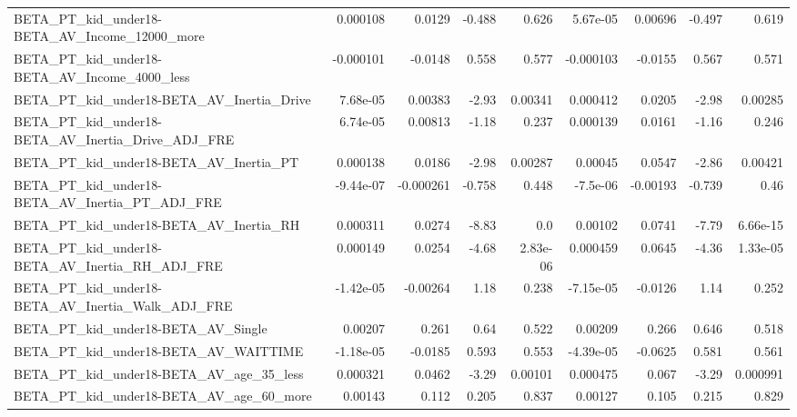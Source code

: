 \begin{tabular}{lrrrrrrrr}
BETA\_PT\_kid\_under18-BETA\_AV\_Income\_12000\_more      &    0.000108 &       0.0129 &   -0.488 &    0.626 &   5.67e-05 &     0.00696 &       -0.497 &         0.619 \\
BETA\_PT\_kid\_under18-BETA\_AV\_Income\_4000\_less       &   -0.000101 &      -0.0148 &    0.558 &    0.577 &  -0.000103 &     -0.0155 &        0.567 &         0.571 \\
BETA\_PT\_kid\_under18-BETA\_AV\_Inertia\_Drive          &    7.68e-05 &      0.00383 &    -2.93 &  0.00341 &   0.000412 &      0.0205 &        -2.98 &       0.00285 \\
BETA\_PT\_kid\_under18-BETA\_AV\_Inertia\_Drive\_ADJ\_FRE  &    6.74e-05 &      0.00813 &    -1.18 &    0.237 &   0.000139 &      0.0161 &        -1.16 &         0.246 \\
BETA\_PT\_kid\_under18-BETA\_AV\_Inertia\_PT             &    0.000138 &       0.0186 &    -2.98 &  0.00287 &    0.00045 &      0.0547 &        -2.86 &       0.00421 \\
BETA\_PT\_kid\_under18-BETA\_AV\_Inertia\_PT\_ADJ\_FRE     &   -9.44e-07 &    -0.000261 &   -0.758 &    0.448 &   -7.5e-06 &    -0.00193 &       -0.739 &          0.46 \\
BETA\_PT\_kid\_under18-BETA\_AV\_Inertia\_RH             &    0.000311 &       0.0274 &    -8.83 &      0.0 &    0.00102 &      0.0741 &        -7.79 &      6.66e-15 \\
BETA\_PT\_kid\_under18-BETA\_AV\_Inertia\_RH\_ADJ\_FRE     &    0.000149 &       0.0254 &    -4.68 & 2.83e-06 &   0.000459 &      0.0645 &        -4.36 &      1.33e-05 \\
BETA\_PT\_kid\_under18-BETA\_AV\_Inertia\_Walk\_ADJ\_FRE   &   -1.42e-05 &     -0.00264 &     1.18 &    0.238 &  -7.15e-05 &     -0.0126 &         1.14 &         0.252 \\
BETA\_PT\_kid\_under18-BETA\_AV\_Single                 &     0.00207 &        0.261 &     0.64 &    0.522 &    0.00209 &       0.266 &        0.646 &         0.518 \\
BETA\_PT\_kid\_under18-BETA\_AV\_WAITTIME               &   -1.18e-05 &      -0.0185 &    0.593 &    0.553 &  -4.39e-05 &     -0.0625 &        0.581 &         0.561 \\
BETA\_PT\_kid\_under18-BETA\_AV\_age\_35\_less            &    0.000321 &       0.0462 &    -3.29 &  0.00101 &   0.000475 &       0.067 &        -3.29 &      0.000991 \\
BETA\_PT\_kid\_under18-BETA\_AV\_age\_60\_more            &     0.00143 &        0.112 &    0.205 &    0.837 &    0.00127 &       0.105 &        0.215 &         0.829 \\

\end{tabular}
